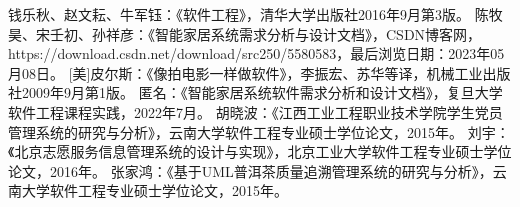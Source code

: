 

\begin{thebibliography}{99}  

钱乐秋、赵文耘、牛军钰：《软件工程》，清华大学出版社2016年9月第3版。
陈牧昊、宋壬初、孙祥彦：《智能家居系统需求分析与设计文档》，CSDN博客网，https://download.csdn.net/download/src250/5580583，最后浏览日期：2023年05月08日。
[美]皮尔斯：《像拍电影一样做软件》，李振宏、苏华等译，机械工业出版社2009年9月第1版。
匿名：《智能家居系统软件需求分析和设计文档》，复旦大学软件工程课程实践，2022年7月。
胡晓波：《江西工业工程职业技术学院学生党员管理系统的研究与分析》，云南大学软件工程专业硕士学位论文，2015年。
刘宇：《北京志愿服务信息管理系统的设计与实现》，北京工业大学软件工程专业硕士学位论文，2016年。
张家鸿：《基于UML普洱茶质量追溯管理系统的研究与分析》，云南大学软件工程专业硕士学位论文，2015年。

\end{thebibliography}


\newpage